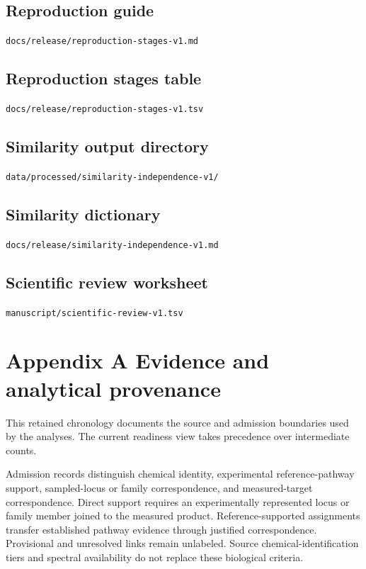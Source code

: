 \documentclass[
  10pt,
  a4paper,
]{article}
\begin{document}
\subsection{Reproduction guide}\label{reproduction-guide}

\nolinkurl{docs/release/reproduction-stages-v1.md}

\subsection{Reproduction stages table}\label{reproduction-stages-table}

\nolinkurl{docs/release/reproduction-stages-v1.tsv}

\subsection{Similarity output directory}\label{similarity-output-directory}

\nolinkurl{data/processed/similarity-independence-v1/}

\subsection{Similarity dictionary}\label{similarity-dictionary}

\nolinkurl{docs/release/similarity-independence-v1.md}

\subsection{Scientific review worksheet}\label{scientific-review-worksheet}

\nolinkurl{manuscript/scientific-review-v1.tsv}

\section{Appendix A Evidence and analytical provenance}\label{appendix-a-evidence-and-analytical-provenance}

This retained chronology documents the source and admission boundaries used by the analyses. The current readiness view takes precedence over intermediate counts.

Admission records distinguish chemical identity, experimental reference-pathway support, sampled-locus or family correspondence, and measured-target correspondence. Direct support requires an experimentally represented locus or family member joined to the measured product. Reference-supported assignments transfer established pathway evidence through justified correspondence. Provisional and unresolved links remain unlabeled. Source chemical-identification tiers and spectral availability do not replace these biological criteria.
\end{document}
